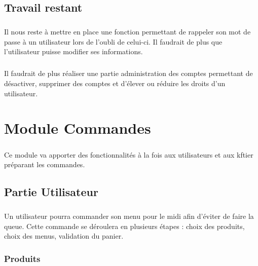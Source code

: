 \documentclass[twoside,UTF8]{EPURapport}
\begin{document}
    \section{Travail restant}
        
        \paragraph{}Il nous reste à mettre en place une fonction permettant de rappeler son mot de passe à un utilisateur lors de l'oubli de celui-ci. Il faudrait de plus que l'utilisateur puisse modifier ses informations.

        \paragraph{}Il faudrait de plus réaliser une partie administration des comptes permettant de désactiver, supprimer des comptes et d'élever ou réduire les droits d'un utilisateur.

\chapter{Module Commandes}

    \paragraph{}Ce module va apporter des fonctionnalités à la fois aux utilisateurs et aux kftier préparant les commandes.

    \section{Partie Utilisateur}

        \paragraph{}Un utilisateur pourra commander son menu pour le midi afin d'éviter de faire la queue. Cette commande se déroulera en plusieurs étapes : choix des produits, choix des menus, validation du panier.

        \subsection{Produits}
\end{document}
